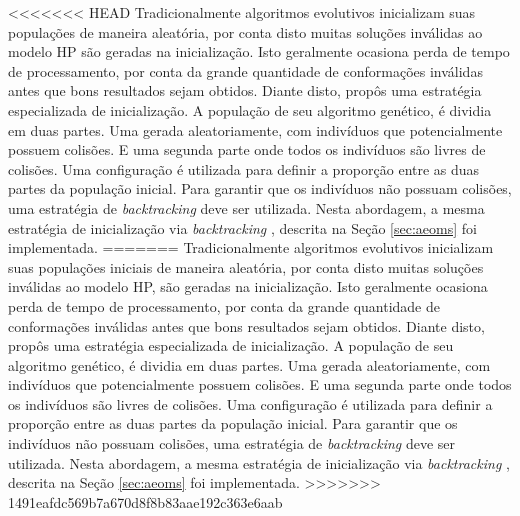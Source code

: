 <<<<<<< HEAD
Tradicionalmente algoritmos evolutivos inicializam suas populações de maneira aleatória, por conta disto  muitas soluções inválidas ao modelo HP são geradas na inicialização. Isto geralmente  ocasiona perda de tempo de processamento, por conta da grande quantidade de conformações inválidas antes que bons resultados sejam obtidos. Diante disto, \cite{benitez2015algoritmo} propôs uma estratégia especializada de inicialização. A população de seu algoritmo genético, é dividia em duas partes. Uma gerada aleatoriamente, com indivíduos que potencialmente possuem colisões. E uma segunda parte onde todos os indivíduos são livres de colisões. Uma configuração é utilizada para definir a proporção entre as duas partes da população inicial. Para garantir que os indivíduos não possuam colisões, uma estratégia de \textit{backtracking} deve ser utilizada. Nesta abordagem, a mesma estratégia de inicialização via \textit{backtracking }, descrita  na Seção \ref{sec:aeoms} foi implementada.
=======
Tradicionalmente algoritmos evolutivos inicializam suas populações iniciais de maneira aleatória, por conta disto  muitas soluções inválidas ao modelo HP, são geradas na inicialização. Isto geralmente  ocasiona perda de tempo de processamento, por conta da grande quantidade de conformações inválidas antes que bons resultados sejam obtidos. Diante disto, \cite{benitez2015algoritmo} propôs uma estratégia especializada de inicialização. A população de seu algoritmo genético, é dividia em duas partes. Uma gerada aleatoriamente, com indivíduos que potencialmente possuem colisões. E uma segunda parte onde todos os indivíduos são livres de colisões. Uma configuração é utilizada para definir a proporção entre as duas partes da população inicial. Para garantir que os indivíduos não possuam colisões, uma estratégia de \textit{backtracking} deve ser utilizada. Nesta abordagem, a mesma estratégia de inicialização via \textit{backtracking }, descrita  na Seção \ref{sec:aeoms} foi implementada.
>>>>>>> 1491eafdc569b7a670d8f8b83aae192c363e6aab








